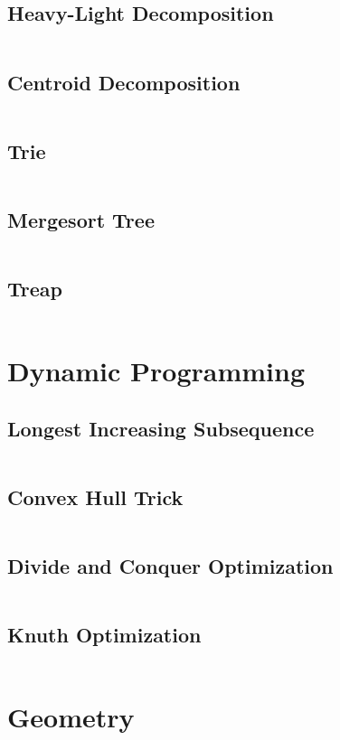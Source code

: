 \documentclass[a4paper, 10pt, twocolumn, landscape]{article}
\begin{document}
  \subsection{Heavy-Light Decomposition}
  \inputminted{cpp}{data-structures/hld.cpp}
  \subsection{Centroid Decomposition}
  \inputminted{cpp}{data-structures/centroid-decomposition.cpp}
  \subsection{Trie}
  \inputminted{cpp}{data-structures/trie.cpp}
  \subsection{Mergesort Tree}
  \inputminted{cpp}{data-structures/mergesort-tree.cpp}
  \subsection{Treap}
  \inputminted{cpp}{data-structures/treap.cpp}

  \section{Dynamic Programming}
  \subsection{Longest Increasing Subsequence}
  \inputminted{cpp}{dynamic-programming/lis.cpp}
  \subsection{Convex Hull Trick}
  \inputminted{cpp}{dynamic-programming/convex-hull-trick.cpp}
  \subsection{Divide and Conquer Optimization}
  \inputminted{cpp}{dynamic-programming/divide-and-conquer-optimization.cpp}
  \subsection{Knuth Optimization}
  \inputminted{cpp}{dynamic-programming/knuth-optimization.cpp}

  \section{Geometry}
\end{document}
